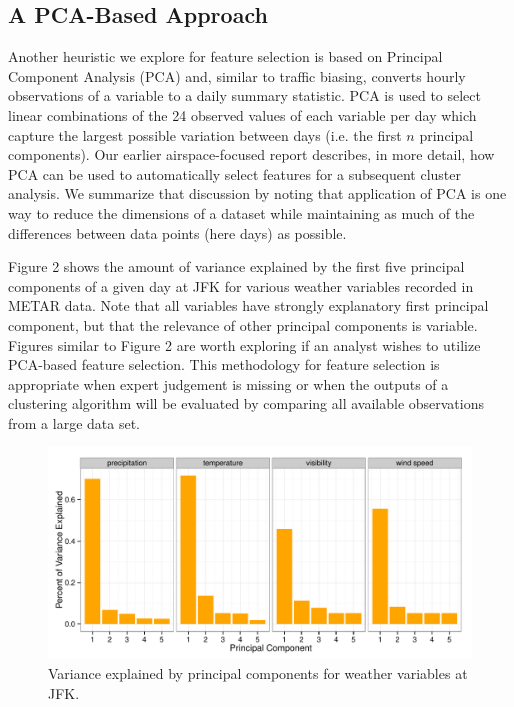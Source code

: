 \documentclass[11pt]{scrartcl}
\begin{document}
\subsection{A PCA-Based Approach}
Another heuristic we explore for feature selection is based on Principal Component Analysis (PCA) and, similar to traffic biasing, converts hourly observations of a variable to a daily summary statistic.  PCA is used to select linear combinations of the 24 observed values of each variable per day which capture the largest possible variation between days (i.e. the first $n$ principal components).  Our earlier airspace-focused report describes, in more detail, how PCA can be used to automatically select features for a subsequent cluster analysis.  We summarize that discussion by noting that application of PCA is one way to reduce the dimensions of a dataset while maintaining as much of the differences between data points (here days) as possible.

Figure 2 shows the amount of variance explained by the first five principal components of a given day at JFK for various weather variables recorded in METAR data.  Note that all variables have strongly explanatory first principal component, but that the relevance of other principal components is variable. Figures similar to Figure 2 are worth exploring if an analyst wishes to utilize PCA-based feature selection. This methodology for feature selection is appropriate when expert judgement is missing or when the outputs of a clustering algorithm will be evaluated by comparing all available observations from a large data set.

\newpage\noindent
\begin{figure}[h]
\begin{center}
\includegraphics[scale=0.8125]{./figures/Fig2.pdf}
\caption{Variance explained by principal components for weather variables at JFK.}
\label{default}
\end{center}
\end{figure}
\end{document}
